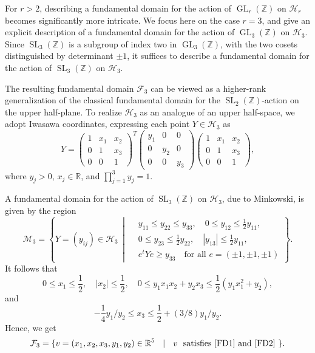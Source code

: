 \documentclass[table]{amsart}
\newcommand{\cF}{\mathcal{F}}
\numberwithin{equation}{section}
\begin{document}
\par For $r > 2$, describing a fundamental domain for the action of $\operatorname{GL}_r(\mathbb{Z})$ on $\mathcal{H}_r$ becomes significantly more intricate. We focus here on the case $r = 3$, and give an explicit description of a fundamental domain for the action of $\operatorname{GL}_3(\mathbb{Z})$ on $\mathcal{H}_3$. Since $\operatorname{SL}_3(\mathbb{Z})$ is a subgroup of index two in $\operatorname{GL}_3(\mathbb{Z})$, with the two cosets distinguished by determinant $\pm 1$, it suffices to describe a fundamental domain for the action of $\operatorname{SL}_3(\mathbb{Z})$ on $\mathcal{H}_3$.

\par The resulting fundamental domain $\mathcal{F}_3$ can be viewed as a higher-rank generalization of the classical fundamental domain for the $\operatorname{SL}_2(\mathbb{Z})$-action on the upper half-plane. To realize $\mathcal{H}_3$ as an analogue of an upper half-space, we adopt Iwasawa coordinates, expressing each point $Y \in \mathcal{H}_3$ as
$$
Y = \begin{pmatrix}
1 & x_1 & x_2 \\
0 & 1 & x_3 \\
0 & 0 & 1
\end{pmatrix}^T\begin{pmatrix}
y_1 & 0 & 0 \\
0 & y_2 & 0 \\
0 & 0 & y_3
\end{pmatrix}
\begin{pmatrix}
1 & x_1 & x_2 \\
0 & 1 & x_3 \\
0 & 0 & 1
\end{pmatrix},
$$
\noindent where $y_j > 0$, $x_j \in \mathbb{R}$, and $\prod_{j=1}^3 y_j = 1$.

\par A fundamental domain for the action of $\operatorname{SL}_3(\mathbb{Z})$ on $\mathcal{H}_3$, due to Minkowski, is given by the region
$$
\mathcal{M}_3 = \left\{ Y = (y_{ij}) \in \mathcal{H}_3 \,\middle|\,
\begin{aligned}
& y_{11} \le y_{22} \le y_{33}, \quad 0 \le y_{12} \le \tfrac{1}{2} y_{11}, \\
& 0 \le y_{23} \le \tfrac{1}{2} y_{22}, \quad |y_{13}| \le \tfrac{1}{2} y_{11}, \\
& e^t Y e \ge y_{33} \quad \text{for all } e = (\pm 1, \pm 1, \pm 1)
\end{aligned}
\right\}.
$$
\noindent It follows that
\begin{equation}\label{FD1}
0 \leqslant x_1 \leqslant \frac{1}{2}, \quad\left|x_2\right| \leqslant \frac{1}{2}, \quad 0 \leqslant y_1 x_1 x_2+y_2 x_3 \leqslant \frac{1}{2}\left(y_1 x_1^2+y_2\right),  
\end{equation}
and
\begin{equation}\label{FD2}
   -\frac{1}{4} y_1 / y_2 \leqslant x_3 \leqslant \frac{1}{2}+(3 / 8) y_1 / y_2. 
\end{equation}
\noindent
Hence, we get 
$$\cF_3 = \{ v =(x_1, x_2, x_3, y_1, y_2) \in \mathbb{R}^5 \ \ \mid \ \  v \ \text{ satisfies \eqref{FD1} and \eqref{FD2}} \ \}.$$
\end{document}
